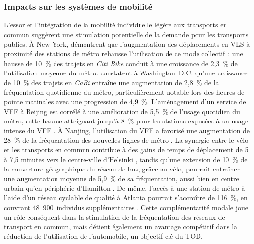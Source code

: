 \begin{refsegment}
\subsubsection*{Impacts sur les systèmes de mobilité
    \label{chap2:impacts-mobilite}
    }
    
L'essor et l'intégration de la mobilité individuelle légère aux transports en commun suggèrent une stimulation potentielle de la demande pour les transports publics. À New York, \textcolor{blue}{\textcite[932]{ashraf_impacts_2021}} démontrent que l'augmentation des déplacements en \acrshort{VLS} à proximité des stations de métro rehausse l'utilisation de ce mode collectif~: une hausse de 10~\% des trajets en \textsl{Citi Bike} conduit à une croissance de 2,3~\% de l'utilisation moyenne du métro. \textcolor{blue}{\textcite[8]{ma_bicycle_2015}} constatent à Washington~D.C. qu'une croissance de 10~\% des trajets en \textsl{CaBi} entraîne une augmentation de 2,8~\% de la fréquentation quotidienne du métro, particulièrement notable lors des heures de pointe matinales avec une progression de 4,9~\%. L'aménagement d'un service de \acrshort{VFF} à Beijing est corrélé à une amélioration de 5,5~\% de l'usage quotidien du métro, cette hausse atteignant jusqu'à 8~\% pour les stations exposées à un usage intense du \acrshort{VFF} \textcolor{blue}{\autocite[8]{fan_dockless_2020}}. À Nanjing, l'utilisation du \acrshort{VFF} a favorisé une augmentation de 28~\% de la fréquentation des nouvelles lignes de métro \textcolor{blue}{\autocite[11]{yang_spatiotemporal_2019}}. La synergie entre le vélo et les transports en commun contribue à des gains de temps de déplacement de 5 à 7,5 minutes vers le centre-ville d'Helsinki \textcolor{blue}{\autocite[22]{jappinen_modelling_2013}}, tandis qu'une extension de 10~\% de la couverture géographique du réseau de bus, grâce au vélo, pourrait entraîner une augmentation moyenne de 5,9~\% de sa fréquentation, aussi bien en centre urbain qu'en périphérie d'Hamilton \textcolor{blue}{\autocite[11]{zuo_promote_2020}}. De même, l'accès à une station de métro à l'aide d'un réseau cyclable de qualité à Atlanta pourrait s'accroître de 116~\%, en couvrant 48~900~individus supplémentaires \textcolor{blue}{\autocite[59]{bearn_adaption_2018}}. Cette complémentarité modale joue un rôle conséquent dans la stimulation de la fréquentation des réseaux de transport en commun, mais détient également un avantage compétitif dans la réduction de l'utilisation de l'automobile, un objectif clé du \acrshort{TOD}.%


\end{refsegment}
